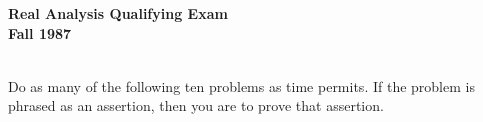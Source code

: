 \documentclass{article}
\begin{document}






\begin{center}\begin{LARGE}
{\bf Real Analysis Qualifying Exam}\\ 
{\bf Fall 1987}\\ \end{LARGE}
\end{center}
\vspace{0.1in}
\noindent\hrulefill\\

Do as many of the following ten problems as time permits. If the problem
is phrased as an assertion, then you are to prove that assertion.
\end{document}
